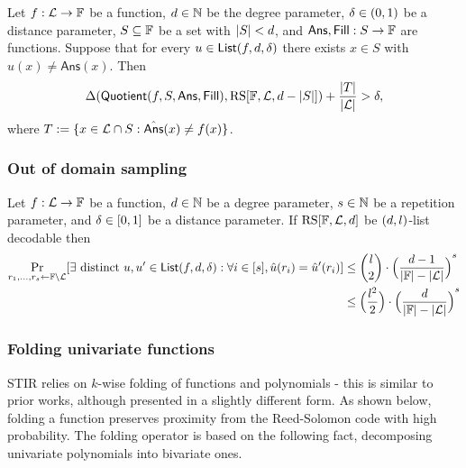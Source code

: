 \begin{lemma}\label{lemma:quotienting}
\leanok
{}
    Let $f:\mathcal{L}\rightarrow\mathbb{F}$ be a function, $d\in\mathbb{N}$ be the degree parameter, $\delta\in(0,1)$
    be a distance parameter, $S\subseteq\mathbb{F}$ be a set with $|S|<d$, and $\mathsf{Ans},\mathsf{Fill}:S\rightarrow\mathbb{F}$ are functions. Suppose that for every $u\in\mathsf{List}(f,d,\delta)$ there exists $x\in S$ with $\hat{u}(x)\neq\mathsf{Ans}(x)$. Then 
    \[
            \Delta(\mathsf{Quotient}(f,S,\mathsf{Ans},\mathsf{Fill}),\mathrm{RS}[\mathbb{F},\mathcal{L},d-|S|])+\frac{|T|}{|\mathcal{L}|}>\delta,
    \]
    where $T:=\{x\in\mathcal{L}\cap S: \hat{\mathsf{Ans}}(x)\neq f(x)\}$.
\end{lemma}

\subsubsection{Out of domain sampling}\label{sec:out_of_domain_smpl}
\begin{lemma}\label{lemma:out_of_domain_smpl}
    Let $f:\mathcal{L}\rightarrow\mathbb{F}$ be a function, $d\in\mathbb{N}$ be a degree parameter, $s\in\mathbb{N}$ be a repetition parameter, and $\delta\in[0,1]$ be a distance parameter. If $\mathrm{RS}[\mathbb{F},\mathcal{L},d]$ be $(d,l)$-list decodable then
    \begin{align*}
    \Pr_{r_1,\ldots,r_s\gets\mathbb{F}\setminus\mathcal{L}}[\exists\text{ distinct }u,u'\in\mathsf{List}(f,d,\delta):\forall i\in[s],\hat{u}(r_i)=\hat{u}'(r_i)] & \leq \binom{l}{2}\cdot{\Big(\frac{d-1}{|\mathbb{F}|-|\mathcal{L}|}\Big)}^s \\
    & \leq \Big(\frac{l^2}{2}\Big)\cdot{\Big(\frac{d}{|\mathbb{F}|-|\mathcal{L}|}\Big)}^s
    \end{align*}
\end{lemma}

\subsubsection{Folding univariate functions}\label{sec:folding_uf}
STIR relies on $k$-wise folding of functions and polynomials - this is similar to prior works, although presented in a slightly different form. As shown below, folding a function preserves proximity from the Reed-Solomon code with high probability. The folding operator is based on the following fact, decomposing univariate polynomials into bivariate ones.

